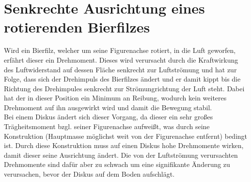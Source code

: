 

\section{Senkrechte Ausrichtung eines rotierenden Bierfilzes}
Wird ein Bierfilz, welcher um seine Figurenachse rotiert, in die Luft geworfen, erfährt dieser ein Drehmoment. Dieses wird verursacht durch die Kraftwirkung des Luftwiderstand auf dessen Fläche senkrecht zur Luftströmung und hat zur Folge, dass sich der Drehimpuls des Bierfilzes ändert und er damit kippt bis die Richtung des Drehimpules senkrecht zur Strömungrichtung der Luft steht. Dabei hat der in dieser Position ein Minimum an Reibung, wodurch kein weiteres Drehmoment auf ihn ausgewirkt wird und damit die Bewegung stabil.\\
Bei einem Diskus ändert sich dieser Vorgang, da dieser ein sehr großes Trägheitsmoment bzgl. seiner Figurenachse aufweißt, was durch seine Konstruktion (Hauptmasse möglichst weit von der Figurenachse entfernt) bedingt ist. Durch diese Konstruktion muss auf einen Diskus hohe Drehmomente wirken, damit dieser seine Ausrichtung ändert. Die von der Luftströmung verursachten Drehmomente sind dafür aber zu schwach um eine signifikante Änderung zu verursachen, bevor der Diskus auf dem Boden aufschlägt.